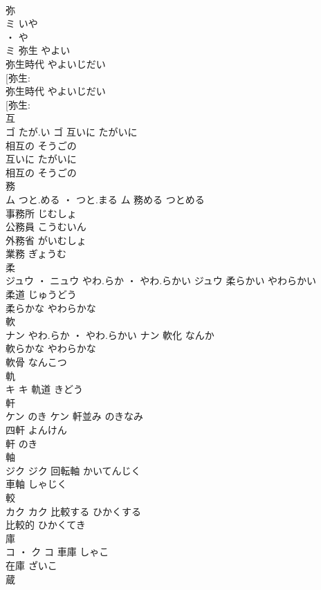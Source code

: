 \documentclass[8pt]{extreport}
\begin{document}
\begin{CJK}{UTF8}{min}
\\	弥	
\\	ミ	いや
\\	・ や
\\	ミ	弥生	やよい	
\\	弥生時代	やよいじだい	
\\	[弥生: 
\\	弥生時代	やよいじだい	
\\	[弥生: 
\\	互	
\\	ゴ	たが.い	ゴ	互いに	たがいに	
\\	相互の	そうごの	
\\	互いに	たがいに	
\\	相互の	そうごの	
\\	務	
\\	ム	つと.める ・ つと.まる	ム	務める	つとめる	
\\	事務所	じむしょ	
\\	公務員	こうむいん	
\\	外務省	がいむしょ	
\\	業務	ぎょうむ	
\\	柔	
\\	ジュウ ・ ニュウ	やわ.らか ・ やわ.らかい	ジュウ	柔らかい	やわらかい	
\\	柔道	じゅうどう	
\\	柔らかな	やわらかな	
\\	軟	
\\	ナン	やわ.らか ・ やわ.らかい	ナン	軟化	なんか	
\\	軟らかな	やわらかな	
\\	軟骨	なんこつ	
\\	軌	
\\	キ		キ													軌道	きどう	
\\	軒	
\\	ケン	のき	ケン	軒並み	のきなみ	
\\	四軒	よんけん	
\\	軒	のき	
\\	軸	
\\	ジク		ジク	回転軸	かいてんじく	
\\	車軸	しゃじく	
\\	較	
\\	カク		カク	比較する	ひかくする	
\\	比較的	ひかくてき	
\\	庫	
\\	コ ・ ク		コ	車庫	しゃこ	
\\	在庫	ざいこ	
\\	蔵	

\end{CJK}
\end{document}
